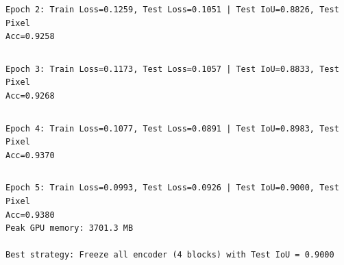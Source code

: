 \documentclass[11pt]{article}
\begin{document}
    \begin{Verbatim}[commandchars=\\\{\}]
Epoch 2: Train Loss=0.1259, Test Loss=0.1051 | Test IoU=0.8826, Test Pixel
Acc=0.9258
    \end{Verbatim}

    \begin{Verbatim}[commandchars=\\\{\}]

    \end{Verbatim}

    \begin{Verbatim}[commandchars=\\\{\}]
Epoch 3: Train Loss=0.1173, Test Loss=0.1057 | Test IoU=0.8833, Test Pixel
Acc=0.9268
    \end{Verbatim}

    \begin{Verbatim}[commandchars=\\\{\}]

    \end{Verbatim}

    \begin{Verbatim}[commandchars=\\\{\}]
Epoch 4: Train Loss=0.1077, Test Loss=0.0891 | Test IoU=0.8983, Test Pixel
Acc=0.9370
    \end{Verbatim}

    \begin{Verbatim}[commandchars=\\\{\}]

    \end{Verbatim}

    \begin{Verbatim}[commandchars=\\\{\}]
Epoch 5: Train Loss=0.0993, Test Loss=0.0926 | Test IoU=0.9000, Test Pixel
Acc=0.9380
Peak GPU memory: 3701.3 MB

Best strategy: Freeze all encoder (4 blocks) with Test IoU = 0.9000
    \end{Verbatim}

    \begin{Verbatim}[commandchars=\\\{\}]

    \end{Verbatim}
\end{document}
